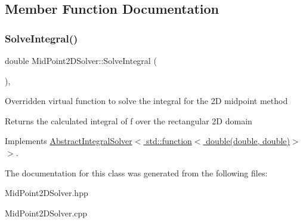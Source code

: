 \subsection{Member Function Documentation}
\mbox{\label{class_mid_point2_d_solver_a45c6c6802b7d40c35f1f60f1a39f5042}} 
\subsubsection{\texorpdfstring{Solve\+Integral()}{SolveIntegral()}}
{\footnotesize\ttfamily double Mid\+Point2\+D\+Solver\+::\+Solve\+Integral (\begin{DoxyParamCaption}{ }\end{DoxyParamCaption})\hspace{0.3cm}{\ttfamily [override]}, {\ttfamily [virtual]}}

Overridden virtual function to solve the integral for the 2D midpoint method \begin{DoxyReturn}{Returns}
the calculated integral of f over the rectangular 2D domain 
\end{DoxyReturn}


Implements \hyperlink{class_abstract_integral_solver_ad87cb44c5ef3122bc95be48f473ba399}{Abstract\+Integral\+Solver$<$ std\+::function$<$ double(double, double)$>$ $>$}.



The documentation for this class was generated from the following files\+:\begin{DoxyCompactItemize}
\item 
Mid\+Point2\+D\+Solver.\+hpp\item 
Mid\+Point2\+D\+Solver.\+cpp\end{DoxyCompactItemize}
